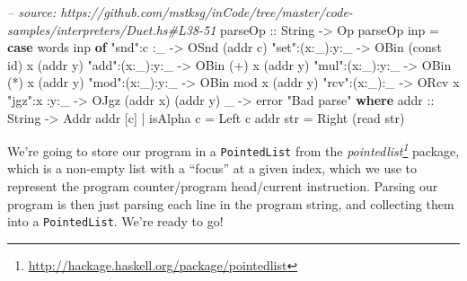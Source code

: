 \documentclass[]{article}
\newenvironment{Shaded}{}{}
\newcommand{\KeywordTok}[1]{\textcolor[rgb]{0.00,0.44,0.13}{\textbf{#1}}}
\newcommand{\DataTypeTok}[1]{\textcolor[rgb]{0.56,0.13,0.00}{#1}}
\newcommand{\StringTok}[1]{\textcolor[rgb]{0.25,0.44,0.63}{#1}}
\newcommand{\CommentTok}[1]{\textcolor[rgb]{0.38,0.63,0.69}{\textit{#1}}}
\newcommand{\OtherTok}[1]{\textcolor[rgb]{0.00,0.44,0.13}{#1}}
\newcommand{\FunctionTok}[1]{\textcolor[rgb]{0.02,0.16,0.49}{#1}}
\newcommand{\NormalTok}[1]{#1}
\renewcommand{\href}[2]{#2\footnote{\url{#1}}}
\begin{document}
\begin{Shaded}
\begin{Highlighting}[]
\CommentTok{-- source: https://github.com/mstksg/inCode/tree/master/code-samples/interpreters/Duet.hs#L38-51}
\OtherTok{parseOp ::} \DataTypeTok{String} \OtherTok{->} \DataTypeTok{Op}
\NormalTok{parseOp inp }\FunctionTok{=} \KeywordTok{case}\NormalTok{ words inp }\KeywordTok{of}
    \StringTok{"snd"}\FunctionTok{:}\NormalTok{c    }\FunctionTok{:}\NormalTok{_   }\OtherTok{->} \DataTypeTok{OSnd}\NormalTok{ (addr c)}
    \StringTok{"set"}\FunctionTok{:}\NormalTok{(x}\FunctionTok{:}\NormalTok{_)}\FunctionTok{:}\NormalTok{y}\FunctionTok{:}\NormalTok{_ }\OtherTok{->} \DataTypeTok{OBin}\NormalTok{ (const id) x (addr y)}
    \StringTok{"add"}\FunctionTok{:}\NormalTok{(x}\FunctionTok{:}\NormalTok{_)}\FunctionTok{:}\NormalTok{y}\FunctionTok{:}\NormalTok{_ }\OtherTok{->} \DataTypeTok{OBin}\NormalTok{ (}\FunctionTok{+}\NormalTok{)        x (addr y)}
    \StringTok{"mul"}\FunctionTok{:}\NormalTok{(x}\FunctionTok{:}\NormalTok{_)}\FunctionTok{:}\NormalTok{y}\FunctionTok{:}\NormalTok{_ }\OtherTok{->} \DataTypeTok{OBin}\NormalTok{ (}\FunctionTok{*}\NormalTok{)        x (addr y)}
    \StringTok{"mod"}\FunctionTok{:}\NormalTok{(x}\FunctionTok{:}\NormalTok{_)}\FunctionTok{:}\NormalTok{y}\FunctionTok{:}\NormalTok{_ }\OtherTok{->} \DataTypeTok{OBin}\NormalTok{ mod        x (addr y)}
    \StringTok{"rcv"}\FunctionTok{:}\NormalTok{(x}\FunctionTok{:}\NormalTok{_)}\FunctionTok{:}\NormalTok{_   }\OtherTok{->} \DataTypeTok{ORcv}\NormalTok{ x}
    \StringTok{"jgz"}\FunctionTok{:}\NormalTok{x    }\FunctionTok{:}\NormalTok{y}\FunctionTok{:}\NormalTok{_ }\OtherTok{->} \DataTypeTok{OJgz}\NormalTok{ (addr x) (addr y)}
\NormalTok{    _               }\OtherTok{->}\NormalTok{ error }\StringTok{"Bad parse"}
  \KeywordTok{where}
\OtherTok{    addr ::} \DataTypeTok{String} \OtherTok{->} \DataTypeTok{Addr}
\NormalTok{    addr [c] }\FunctionTok{|}\NormalTok{ isAlpha c }\FunctionTok{=} \DataTypeTok{Left}\NormalTok{ c}
\NormalTok{    addr str }\FunctionTok{=} \DataTypeTok{Right}\NormalTok{ (read str)}
\end{Highlighting}
\end{Shaded}

We're going to store our program in a \texttt{PointedList} from the
\emph{\href{http://hackage.haskell.org/package/pointedlist}{pointedlist}}
package, which is a non-empty list with a ``focus'' at a given index, which we
use to represent the program counter/program head/current instruction. Parsing
our program is then just parsing each line in the program string, and collecting
them into a \texttt{PointedList}. We're ready to go!
\end{document}
